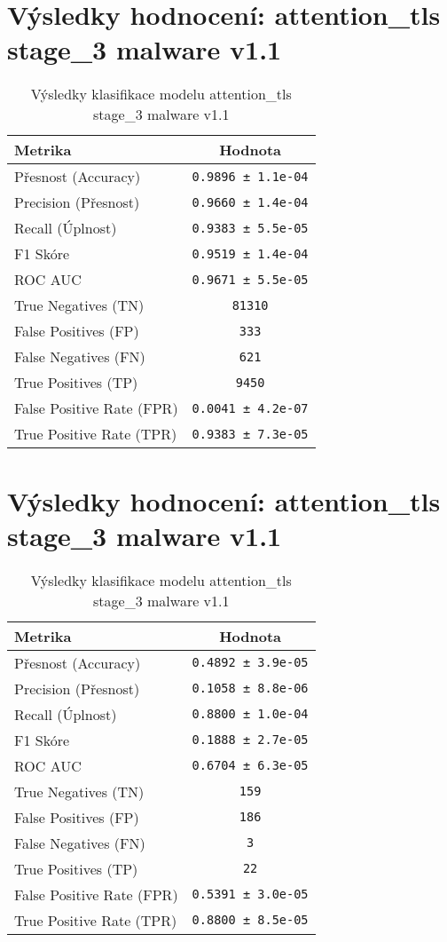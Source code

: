 \section*{Výsledky hodnocení: attention_tls stage_3 malware v1.1}
\begin{table}[h!]
\centering
\begin{tabular}{|l|c|}
\hline
\textbf{Metrika} & \textbf{Hodnota} \\
\hline
Přesnost (Accuracy) & \texttt{0.9896 ± 1.1e-04} \\
Precision (Přesnost) & \texttt{0.9660 ± 1.4e-04} \\
Recall (Úplnost) & \texttt{0.9383 ± 5.5e-05} \\
F1 Skóre & \texttt{0.9519 ± 1.4e-04} \\
ROC AUC & \texttt{0.9671 ± 5.5e-05} \\
True Negatives (TN) & \texttt{81310} \\
False Positives (FP) & \texttt{333} \\
False Negatives (FN) & \texttt{621} \\
True Positives (TP) & \texttt{9450} \\
False Positive Rate (FPR) & \texttt{0.0041 ± 4.2e-07} \\
True Positive Rate (TPR) & \texttt{0.9383 ± 7.3e-05} \\
\hline
\end{tabular}
\caption{Výsledky klasifikace modelu attention_tls stage_3 malware v1.1}
\label{tab:malware_attention_tls}
\end{table}

\section*{Výsledky hodnocení: attention_tls stage_3 malware v1.1}
\begin{table}[h!]
\centering
\begin{tabular}{|l|c|}
\hline
\textbf{Metrika} & \textbf{Hodnota} \\
\hline
Přesnost (Accuracy) & \texttt{0.4892 ± 3.9e-05} \\
Precision (Přesnost) & \texttt{0.1058 ± 8.8e-06} \\
Recall (Úplnost) & \texttt{0.8800 ± 1.0e-04} \\
F1 Skóre & \texttt{0.1888 ± 2.7e-05} \\
ROC AUC & \texttt{0.6704 ± 6.3e-05} \\
True Negatives (TN) & \texttt{159} \\
False Positives (FP) & \texttt{186} \\
False Negatives (FN) & \texttt{3} \\
True Positives (TP) & \texttt{22} \\
False Positive Rate (FPR) & \texttt{0.5391 ± 3.0e-05} \\
True Positive Rate (TPR) & \texttt{0.8800 ± 8.5e-05} \\
\hline
\end{tabular}
\caption{Výsledky klasifikace modelu attention_tls stage_3 malware v1.1}
\label{tab:malware_attention_tls}
\end{table}

